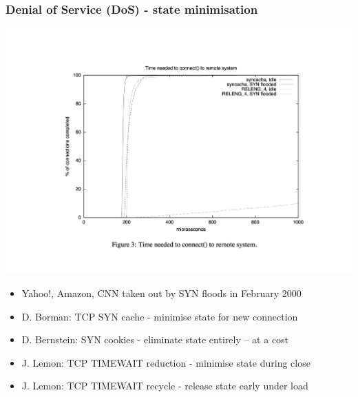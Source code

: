 \begin{frame}
  \frametitle{Denial of Service (DoS) - state minimisation}

  \begin{center}
    \includegraphics[width=.55\textwidth]{../../figures/tcp-syn-flood.pdf}
  \end{center}

  \begin{itemize}
    \item Yahoo!, Amazon, CNN taken out by SYN floods in February 2000
    \item D. Borman: TCP SYN cache - minimise state for new connection
    \item D. Bernstein: SYN cookies - eliminate state entirely -- at a cost
    \item J. Lemon: TCP TIMEWAIT reduction - minimise state during close
    \item J. Lemon: TCP TIMEWAIT recycle - release state early under load
  \end{itemize}
\end{frame}

%
%
%
%
%

